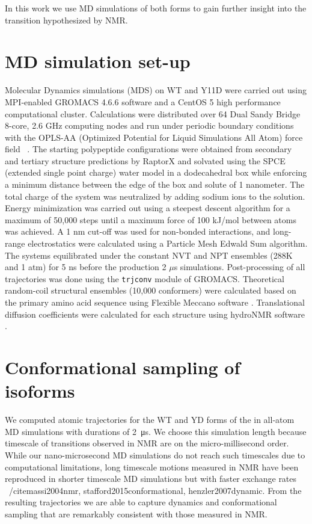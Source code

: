 In this work we use MD simulations of both \gct forms to gain further insight into the transition hypothesized by NMR.  

\section{MD simulation set-up}

Molecular Dynamics simulations (MDS) on WT and Y11D \gct were carried out using MPI-enabled GROMACS 4.6.6 software\cite{hess2008gromacs} and a CentOS 5 high performance computational cluster. Calculations were distributed over 64 Dual Sandy Bridge 8-core, 2.6 GHz computing nodes and run under periodic boundary conditions with the OPLS-AA (Optimized Potential for Liquid Simulations All Atom) force field ~\cite{kaminski2001evaluation}.  The starting \gct polypeptide configurations were obtained from secondary and tertiary structure predictions by RaptorX \cite{kallberg2012template} and solvated using the SPCE (extended single point charge) water model in a dodecahedral box while enforcing a minimum distance between the edge of the box and solute of 1 nanometer. The total charge of the system was neutralized by adding sodium ions to the solution. Energy minimization was carried out using a steepest descent algorithm for a maximum of 50,000 steps until a maximum force of 100 kJ/mol between atoms was achieved. A 1 nm cut-off was used for non-bonded interactions, and long-range electrostatics were calculated using a Particle Mesh Edwald Sum algorithm. The systems equilibrated under the constant NVT and NPT ensembles (288K and 1 atm) for 5 ns before the production 2 $\mu$s simulations. Post-processing of all trajectories was done using the \texttt{trjconv} module of GROMACS. Theoretical random-coil structural ensembles (10,000 conformers) were calculated based on the \gct primary amino acid sequence using Flexible Meccano software \cite{ozenne2012flexible}. Translational diffusion coefficients were calculated for each structure using hydroNMR software \cite{de2000hydronmr}. 


\section{Conformational sampling of \gct isoforms}

We computed atomic trajectories for the WT and YD forms of the \gct in all-atom MD simulations with durations of \SI{2}{\us}. We choose this simulation length because timescale of transitions observed in NMR are on the micro-millisecond order. While our nano-microsecond MD simulations do not reach such timescales due to computational limitations, long timescale motions measured in NMR have been reproduced in shorter timescale MD simulations but with faster exchange rates ~/cite{massi2004nmr, stafford2015conformational, henzler2007dynamic}. From the resulting trajectories we are able to capture dynamics and conformational sampling that are remarkably consistent with those measured in NMR.\\


